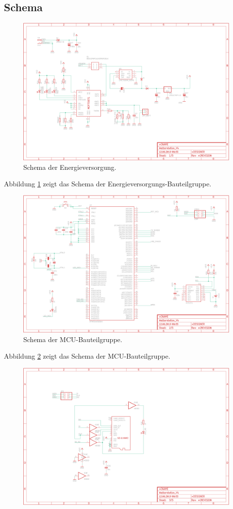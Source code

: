 \begin{appendix}
\begin{landscape}
\section{Schema}
\label{Anhang:Schema}
\begin{figure}[h]
\centering
\includegraphics[width=0.66\linewidth]{graphics/Anhang_Eagle/PowerSupply.png}
\caption{Schema der Energieversorgung.}
\label{fig:Anhang_PowerSupply}
\end{figure}
Abbildung \ref{fig:Anhang_PowerSupply} zeigt das Schema der Energieversorgungs-Bauteilgruppe.
\newpage
\begin{figure}[h]
\centering
\includegraphics[width=0.7\linewidth]{graphics/Anhang_Eagle/MCU.png}
\caption{Schema der MCU-Bauteilgruppe.}
\label{fig:Anhang_MCU}
\end{figure}
Abbildung \ref{fig:Anhang_MCU} zeigt das Schema der MCU-Bauteilgruppe.
\newpage
\begin{figure}[h]
\centering
\includegraphics[width=0.7\linewidth]{graphics/Anhang_Eagle/uSDCard.png}

\end{figure}
\end{landscape}
\end{appendix}
